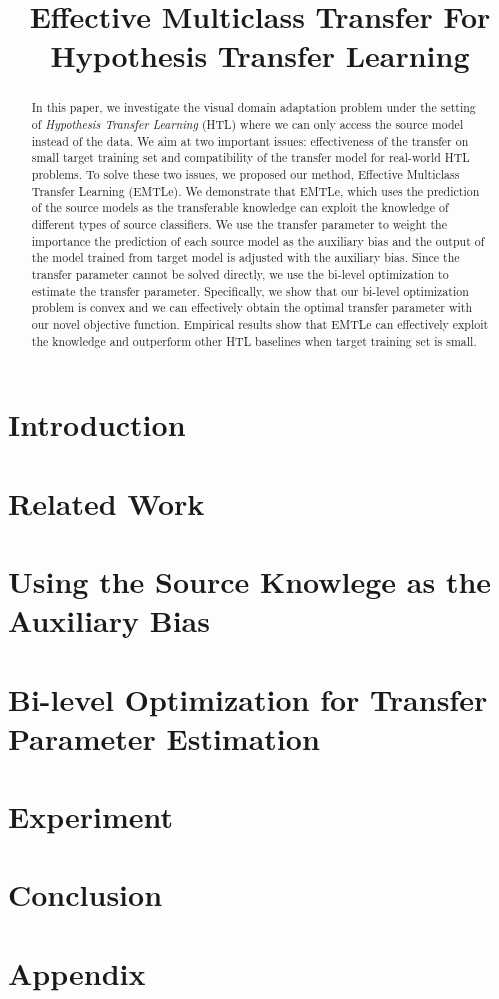 \documentclass{llncs}
\begin{document}
\title{Effective Multiclass Transfer For Hypothesis Transfer Learning}
\maketitle
\begin{abstract}
	In this paper, we investigate the visual domain adaptation problem under the setting of \textit{Hypothesis Transfer Learning} (HTL) where we can only access the source model instead of the data. We aim at two important issues: effectiveness of the transfer on small target training set and compatibility of the transfer model for real-world HTL problems. To solve these two issues, we proposed our method, Effective Multiclass Transfer Learning (EMTLe).
	We demonstrate that EMTLe, which uses the prediction of the source models as the transferable knowledge can exploit the knowledge of different types of source classifiers. We use the transfer parameter to weight the importance the prediction of each source model as the auxiliary bias and the output of the model trained from target model is adjusted with the auxiliary bias. Since the transfer parameter cannot be solved directly, we use the bi-level optimization to estimate the transfer parameter. Specifically, we show that our bi-level optimization problem is convex and we can effectively obtain the optimal transfer parameter with our novel objective function. Empirical results show that EMTLe can effectively exploit the knowledge and outperform other HTL baselines when target training set is small.  
\end{abstract}

\section{Introduction}


\section{Related Work}\label{sec:work}


\section{Using the Source Knowlege as the Auxiliary Bias}\label{sec:prob}


\section{Bi-level Optimization for Transfer Parameter Estimation}\label{sec:smitle}


%

\section{Experiment}\label{sec:exp}


\section{Conclusion}



\section*{Appendix}







\end{document}
